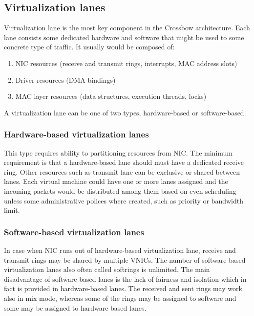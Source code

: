 \documentclass[11pt]{book}
\begin{document}
		\subsection{Virtualization lanes}

      Virtualization lane is the most key component in the Crossbow architecture. Each lane consists
      some dedicated hardware and software that might be used to some concrete type of traffic. It
      usually would be composed of: 

			\begin{enumerate}
				\item NIC resources (receive and transmit rings, interrupts, MAC address slots)
				\item Driver resources (DMA bindings)
				\item MAC layer resources (data structures, execution threads, locks)
			\end{enumerate}
			
			A virtualization lane can be one of two types, hardware-based or software-based.
			
			\subsubsection{Hardware-based virtualization lanes}
			
      This type requires ability to partitioning resources from NIC. The minimum requirement is that a hardware-based
      lane should must have a dedicated receive ring.  Other resources such as transmit lane can be exclusive or shared
      between lanes. Each virtual machine could have one or more lanes assigned and the incoming packets would be
      distributed among them based on even scheduling unless some administrative polices where created, such as priority
      or bandwidth limit.		
			
			\subsubsection{Software-based virtualization lanes}
			
      In case when NIC runs out of hardware-based virtualization lane, receive and transmit rings may be shared by
      multiple VNICs. The number of software-based virtualization lanes also often called softrings is unlimited. The
      main disadvantage of software-based lanes is the lack of fairness and isolation which in fact is provided in
      hardware-based lanes. The received and sent rings may work also in mix mode, whereas some of the rings may be
      assigned to software and some may be assigned to hardware based lanes.	
			
\end{document}
